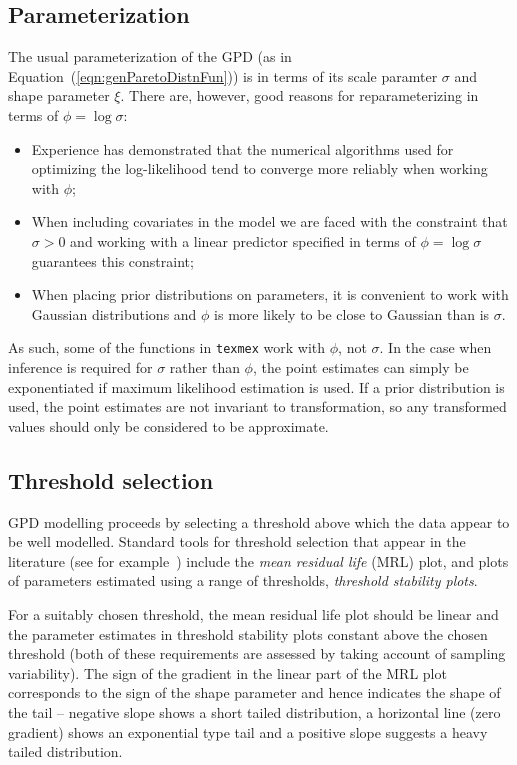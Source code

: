 \documentclass[10pt]{article}\usepackage[]{graphicx}\usepackage[]{color}
\begin{document}
\subsection{Parameterization}
\label{sect:parameterization}
%
The usual parameterization of the GPD (as in Equation~(\ref{eqn:genParetoDistnFun})) is in terms of its
scale paramter $\sigma$ and shape parameter $\xi$. There
are, however, good reasons for reparameterizing in terms
of $\phi = \log\sigma$:
\begin{itemize}
\item Experience has demonstrated that the numerical
algorithms used for optimizing the log-likelihood tend
to converge more reliably when working with $\phi$;
\item When including covariates in the model we are
faced with the constraint that $\sigma > 0$ and working
with a linear predictor specified in terms of $\phi = \log\sigma$
guarantees this constraint;
\item When placing prior distributions on parameters,
it is convenient to work with Gaussian distributions and
$\phi$ is more likely to be close to Gaussian than is
$\sigma$.
\end{itemize}
As such, some of the functions in {\tt texmex} work with $\phi$, not
$\sigma$. In the case when inference is required for $\sigma$ rather than $\phi$, the point estimates
can simply be exponentiated if
maximum likelihood estimation is used. If a prior distribution is
used, the point estimates are not invariant to transformation,
so any transformed values should only be considered to
be approximate.
%
\subsection{Threshold selection}
%
GPD modelling proceeds by selecting a threshold above
which the data appear to be well modelled. Standard
tools for threshold selection that appear in the
literature (see for example~\cite{coles}) include the \emph{mean residual
life} (MRL) plot, and plots of parameters estimated using a range of
thresholds, \emph{threshold stability plots}.

For a suitably chosen threshold, the mean residual life
plot should be linear and the parameter estimates in threshold stability plots
constant above the chosen threshold (both of these requirements are assessed by taking account of sampling variability). The sign of the gradient in the linear part of the MRL plot corresponds to the sign of the shape parameter and hence indicates the shape of the tail -- negative slope shows a short tailed distribution, a horizontal line (zero gradient) shows an exponential type tail and a positive slope suggests a heavy tailed distribution.
\end{document}
